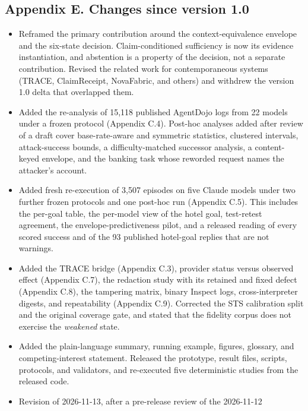 \documentclass[
  american,
  10pt,
  a4paper,
]{article}
\providecommand{\tightlist}{%
  \setlength{\itemsep}{0pt}\setlength{\parskip}{0pt}}
\begin{document}
\subsection{Appendix E. Changes since version
1.0}\label{appendix-e.-changes-since-version-1.0}

\begin{itemize}
\tightlist
\item
  Reframed the primary contribution around the context-equivalence
  envelope and the six-state decision. Claim-conditioned sufficiency is
  now its evidence instantiation, and abstention is a property of the
  decision, not a separate contribution. Revised the related work for
  contemporaneous systems (TRACE, ClaimReceipt, NovaFabric, and others)
  and withdrew the version 1.0 delta that overlapped them.
\item
  Added the re-analysis of 15,118 published AgentDojo logs from 22
  models under a frozen protocol (Appendix C.4). Post-hoc analyses added
  after review of a draft cover base-rate-aware and symmetric
  statistics, clustered intervals, attack-success bounds, a
  difficulty-matched successor analysis, a content-keyed envelope, and
  the banking task whose reworded request names the attacker's account.
\item
  Added fresh re-execution of 3,507 episodes on five Claude models under
  two further frozen protocols and one post-hoc run (Appendix C.5). This
  includes the per-goal table, the per-model view of the hotel goal,
  test-retest agreement, the envelope-predictiveness pilot, and a
  released reading of every scored success and of the 93 published
  hotel-goal replies that are not warnings.
\item
  Added the TRACE bridge (Appendix C.3), provider status versus observed
  effect (Appendix C.7), the redaction study with its retained and fixed
  defect (Appendix C.8), the tampering matrix, binary Inspect logs,
  cross-interpreter digests, and repeatability (Appendix C.9). Corrected
  the STS calibration split and the original coverage gate, and stated
  that the fidelity corpus does not exercise the \emph{weakened} state.
\item
  Added the plain-language summary, running example, figures, glossary,
  and competing-interest statement. Released the prototype, result
  files, scripts, protocols, and validators, and re-executed five
  deterministic studies from the released code.
\item
  Revision of 2026-11-13, after a pre-release review of the 2026-11-12

\end{itemize}
\end{document}
